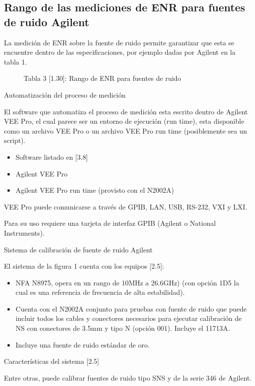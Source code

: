 \subsection{Rango de las mediciones de ENR para fuentes de ruido Agilent}
La medición de ENR sobre la fuente de ruido permite garantizar que esta se encuentre dentro de las especificaciones, por ejemplo dadas por Agilent en la tabla 1.		

\begin{figure}
\centering
\begin{minipage}{5.29cm}
	Tabla 3 [1.30]:				
	Rango de ENR para fuentes de ruido
\end{minipage}
\end{figure}
Automatización del proceso de medición

El software que automatiza el proceso de medición esta escrito dentro de Agilent VEE Pro, el cual parece ser un entorno de ejecución (run time), esta disponible como un archivo VEE Pro o un archivo VEE Pro run time (posiblemente sea un script). 

\begin{itemize}
\item Software listado en [3.8]
\item Agilent VEE Pro
\item Agilent VEE Pro run time (provisto con el N2002A)
\end{itemize}
VEE Pro puede comunicarse a través de GPIB, LAN, USB, RS-232, VXI y LXI.

Para su uso requiere una tarjeta de interfaz GPIB (Agilent o National Instruments).

Sistema de calibración de fuente de ruido Agilent		

El sistema de la figura 1 cuenta con los equipos [2.5]:

\begin{itemize}
\item NFA N8975, opera en un rango de 10MHz a 26.6GHz) (con opción 1D5 la cual es una referencia de frecuencia de alta
estabilidad). 
\item Cuenta con el N2002A conjunto para pruebas con fuente de ruido que puede incluir todos los cables y conectores
necesarios para ejecutar calibración de NS con conectores de 3.5mm y tipo N (opción 001). Incluye el 11713A. 
\item Incluye una fuente de ruido estándar de oro.
\end{itemize}
Características del sistema [2.5]

Entre otras, puede calibrar fuentes de ruido tipo SNS y de la serie 346 de Agilent.

